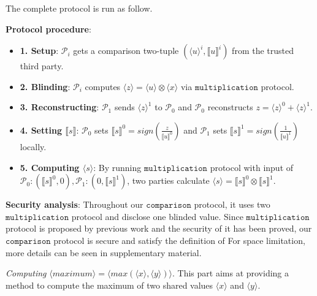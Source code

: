 \documentclass[letterpaper]{article} %
\begin{document}
       The complete protocol is run as follow.

       \textbf{Protocol procedure}:
       \begin{itemize}
           \item \textbf{1. Setup}: $\mathcal{P}_{i}$ gets a comparison two-tuple $(\langle u\rangle ^{i},\llbracket u \rrbracket ^{i})$ from the trusted third party.

           \item \textbf{2. Blinding}:
           $\mathcal{P}_{i}$ computes $\langle z\rangle = \langle u\rangle \otimes \langle x\rangle $ via $\mathtt{multiplication}$ protocol.


           \item \textbf{3. Reconstructing}:
           $\mathcal{P}_{1}$ sends $\langle z\rangle ^{1}$ to $\mathcal{P}_{0}$ and
           $\mathcal{P}_{0}$ reconstructs
           $z = \langle z\rangle ^{0}+\langle z\rangle ^{1}$.



           \item \textbf{4. Setting $\llbracket s \rrbracket$}:
           $\mathcal{P}_{0}$ sets $\llbracket s \rrbracket^{0}
           =sign(\frac{z}{\llbracket u \rrbracket^{0}})$
           and $\mathcal{P}_{1}$ sets $\llbracket s \rrbracket^{1}
           =sign(\frac{1}{\llbracket u \rrbracket^{1}})$ locally.

           \item \textbf{5. Computing $\langle s\rangle$}:
           By running $\mathtt{multiplication}$ protocol with input of
           $\mathcal{P}_{0}:(\llbracket s \rrbracket ^{0},0),\mathcal{P}_{1}:(0,\llbracket s \rrbracket ^{1})$,
           two parties calculate  $\langle s\rangle = \llbracket s \rrbracket ^{0}\otimes \llbracket s \rrbracket ^{1}$.

       \end{itemize}
       \textbf{Security analysis}:
       Throughout our $\mathtt{comparison}$ protocol,
       it uses two $\mathtt{multiplication}$ protocol and disclose one blinded value.
       Since $\mathtt{multiplication}$ protocol is proposed by previous work
       and the security of it has been proved, our $\mathtt{comparison}$ protocol is secure
       and satisfy the definition of
       For space limitation, more details can be seen in supplementary material.



       \emph{Computing} $ \langle maximum\rangle  = \langle max(\langle x\rangle,\langle y\rangle)\rangle $.
       This part aims at providing a method to compute the maximum of two shared values $\langle x \rangle$ and $\langle y \rangle$.
\end{document}
